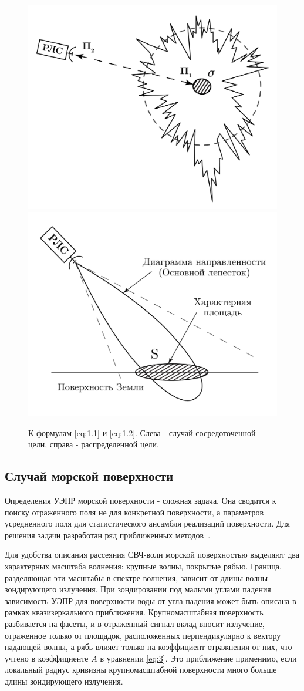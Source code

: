 \begin{figure}[h!]
  \centering
  \includegraphics[width = .49\linewidth]{img/rls.pdf}
  \includegraphics[width = .49\linewidth]{img/rls2.pdf}
  \caption{К формулам \eqref{eq:1.1} и \eqref{eq:1.2}. Слева - случай сосредоточенной цели, справа - распределенной цели.}
  \label{fig:1}
\end{figure}

\subsection{Случай морской поверхности}

Определения УЭПР морской поверхности  - сложная задача. Она сводится к поиску отраженного поля не для
конкретной поверхности, а параметров усредненного поля для статистического ансамбля реализаций поверхности. Для решения задачи
разработан ряд приближенных методов~\cite{bassfuks}.

Для удобства описания рассеяния СВЧ-волн морской поверхностью выделяют два характерных масштаба волнения: крупные волны,
покрытые рябью. Граница, разделяющая эти масштабы в спектре волнения, зависит от длины волны зондирующего излучения.
При зондировании под малыми углами падения зависимость УЭПР для поверхности воды от угла падения может быть описана в
рамках квазизеркального приближения. Крупномасштабная поверхность разбивается на
фасеты, и в отраженный сигнал вклад вносит излучение, отраженное только от площадок, расположенных
перпендикулярно к вектору падающей волны, а рябь влияет только на коэффициент отражнения от них, что учтено в коэффициенте $A$ в уравнении \eqref{eq:3}.
Это приближение применимо, если локальный радиус кривизны крупномасштабной поверхности много больше
длины зондирующего излучения.


